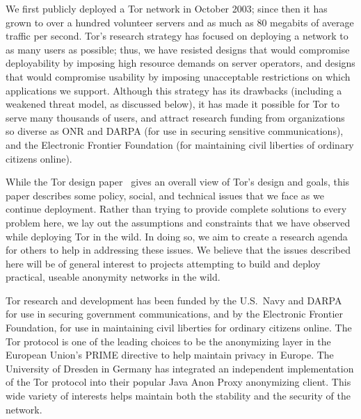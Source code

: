 \documentclass{llncs}
\begin{document}
We first publicly deployed a Tor network in October 2003; since then it has
grown to over a hundred volunteer servers and as much as 80 megabits of
average traffic per second.  Tor's research strategy has focused on deploying
a network to as many users as possible; thus, we have resisted designs that
would compromise deployability by imposing high resource demands on server
operators, and designs that would compromise usability by imposing
unacceptable restrictions on which applications we support.  Although this
strategy has
its drawbacks (including a weakened threat model, as discussed below), it has
made it possible for Tor to serve many thousands of users, and attract
research funding from organizations so diverse as ONR and DARPA
(for use in securing sensitive communications), and the Electronic Frontier
Foundation (for maintaining civil liberties of ordinary citizens online).

While the Tor design paper~\cite{tor-design} gives an overall view of Tor's
design and goals, this paper describes some policy, social, and technical
issues that we face as we continue deployment.
Rather than trying to provide complete solutions to every problem here, we
lay out the assumptions and constraints that we have observed while
deploying Tor in the wild.  In doing so, we aim to create a research agenda
for others to help in addressing these issues.  We believe that the issues
described here will be of general interest to projects attempting to build
and deploy practical, useable anonymity networks in the wild.


Tor research and development has been funded by the U.S.~Navy and DARPA
for use in securing government
communications, and by the Electronic Frontier Foundation, for use
in maintaining civil liberties for ordinary citizens online. The Tor
protocol is one of the leading choices
to be the anonymizing layer in the European Union's PRIME directive to
help maintain privacy in Europe. The University of Dresden in Germany
has integrated an independent implementation of the Tor protocol into
their popular Java Anon Proxy anonymizing client. This wide variety of
interests helps maintain both the stability and the security of the
network.


\end{document}
